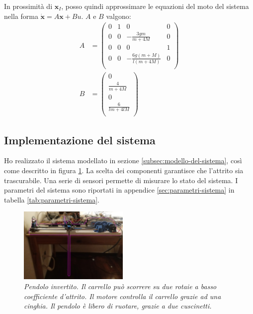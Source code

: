 In prossimità di $\mathbf x_I$, posso quindi approssimare le equazioni del moto del sistema nella forma
$\dot {\mathbf x} = A\mathbf x + B u$. $A$ e $B$ valgono:
\begin{equation}
  \begin{aligned}
    A &=
    \left(\begin{array}{cccc}0&1&0&0\\0&0&-\frac{3gm}{m+4M}&0\\0&0&0&1\\0&0&-\frac{6g(m+M)}{l(m+4M)}&0\\\end{array}\right)
    \\
    B &=
    \left(\begin{array}{c}0\\\frac{4}{m+4M}\\0\\\frac{6}{lm+4lM}\\\end{array}\right)
    \label{eq:A-e-B}
    \end{aligned}
\end{equation}

\subsection{Implementazione del sistema}\label{subsec:implementazione-del-sistema}
Ho realizzato il sistema modellato in sezione \ref{subsec:modello-del-sistema}, così come descritto in figura \ref{fig:foto}.
La scelta dei componenti garantisce che l'attrito sia trascurabile.
Una serie di sensori permette di misurare lo stato del sistema.
I parametri del sistema sono riportati in appendice \ref{sec:parametri-sistema} in tabella \ref{tab:parametri-sistema}.

\begin{figure}[h]
  \includegraphics[width=0.47\textwidth]{../assets/pend-down.jpg}
  \caption{\emph{Pendolo invertito. Il carrello può scorrere su due rotaie a basso coefficiente d'attrito. Il motore
  controlla il carrello grazie ad una cinghia. Il pendolo è libero di ruotare, grazie a due cuscinetti.}}
  \label{fig:foto}
\end{figure}
